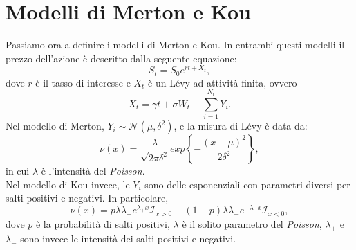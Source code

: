 \documentclass[a4paper,10pt]{report}
\theoremstyle{plain}
\theoremstyle{definition}
\theoremstyle{remark}
\begin{document}
\section{Modelli di Merton e Kou}
Passiamo ora a definire i modelli di Merton e Kou. In entrambi questi modelli il prezzo dell'azione \`e descritto dalla seguente equazione:
\begin{equation}
S_t=S_0e^{rt+X_t},
\label{explevy}
\end{equation}
dove $r$ \`e il tasso di interesse e $X_t$ \`e un L\'evy ad attivit\`a finita, ovvero $$X_t=\gamma t+\sigma W_t+\sum_{i=1}^{N_t}Y_i.$$Nel modello di Merton, $Y_i\sim\mathcal{N}(\mu, \delta^2)$, e la misura di L\'evy \`e data da:
\begin{equation}
\nu(x)=\frac{\lambda}{\sqrt{2\pi\delta^2}}exp\left\{-\frac{(x-\mu)^2}{2\delta^2}\right\},
\label{merton}
\end{equation}
in cui $\lambda$ \`e l'intensit\`a del \emph{Poisson}.\\Nel modello di Kou invece, le $Y_i$ sono delle esponenziali con parametri diversi per salti positivi e negativi. In particolare, $$\nu(x)=p\lambda\lambda_+e^{\lambda_+x}\mathcal{I}_{x>0}+(1-p)\lambda\lambda_-e^{-\lambda_-x}\mathcal{I}_{x<0},$$dove $p$ \`e la probabilit\`a di salti positivi, $\lambda$ \`e il solito parametro del \emph{Poisson}, $\lambda_+$ e $\lambda_-$ sono invece le intensit\`a dei salti positivi e negativi.
\end{document}
